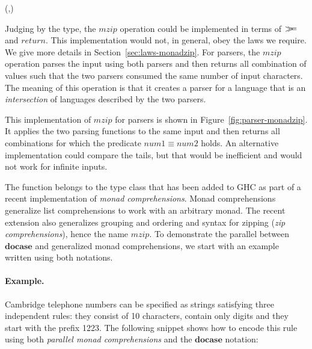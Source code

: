 \documentclass{sigplanconf}
\newcommand{\Conid}[1]{\mathit{#1}}
\newcommand{\Varid}[1]{\mathit{#1}}
\newcommand{\bind}{\mathbin{>\!\!\!>\mkern-6.7mu=}}
\def\resethooks{%
  \global\let\SaveRestoreHook\empty
  \global\let\ColumnHook\empty}
\let\hspre\empty
\let\hspost\empty
\begin{document}
\begin{hscode}\SaveRestoreHook
\column{B}{@{}>{\hspre}l<{\hspost}@{}}%
\column{E}{@{}>{\hspre}l<{\hspost}@{}}%
\>[B]{}\Varid{mzip}\mathbin{::}\Conid{Parser}\;\Varid{a}\to \Conid{Parser}\;\Varid{b}\to \Conid{Parser}\;(\Varid{a},\Varid{b}){}\<[E]%
\ColumnHook
\end{hscode}\resethooks
Judging by the type, the \ensuremath{\Varid{mzip}} operation could be implemented in terms of \ensuremath{\bind } and \ensuremath{\Varid{return}}. 
This implementation would not, in general, obey the laws we require. We give more details in 
Section~\ref{sec:laws-monadzip}. For parsers, the \ensuremath{\Varid{mzip}} operation parses the input using both parsers and then 
returns all combination of values such that the two parsers consumed the same number of input 
characters. The meaning of this operation is that it creates a parser for a language that is an 
\textit{intersection} of languages described by the two parsers.

This implementation of \ensuremath{\Varid{mzip}} for parsers is shown in Figure~\ref{fig:parser-monadzip}. It
applies the two parsing functions to the same input and then returns all combinations for which
the predicate \ensuremath{\Varid{num1}\equiv \Varid{num2}} holds. An alternative implementation could compare the tails, but
that would be inefficient and would not work for infinite inputs.

The function belongs to the  type class that has been added to GHC as part of a recent
implementation of \textit{monad comprehensions}. Monad comprehensions \cite{comprehendingmonads} 
generalize list comprehensions to work with an arbitrary monad. The recent extension
\cite{bringbackmc, comprefun} also generalizes grouping and ordering \cite{groupordercompre} and
syntax for zipping (\textit{zip comprehensions}), hence the name \ensuremath{\Varid{mzip}}. To demonstrate the 
parallel between \ensuremath{\mathbf{docase}} and generalized monad comprehensions, we start with an example written 
using both notations.

\paragraph{Example.}
Cambridge telephone numbers can be specified as strings satisfying three independent rules: 
they consist of 10 characters, contain only digits and they start with the prefix 1223. The following
snippet shows how to encode this rule using both \textit{parallel monad comprehensions} and 
the \ensuremath{\mathbf{docase}} notation:
\end{document}
